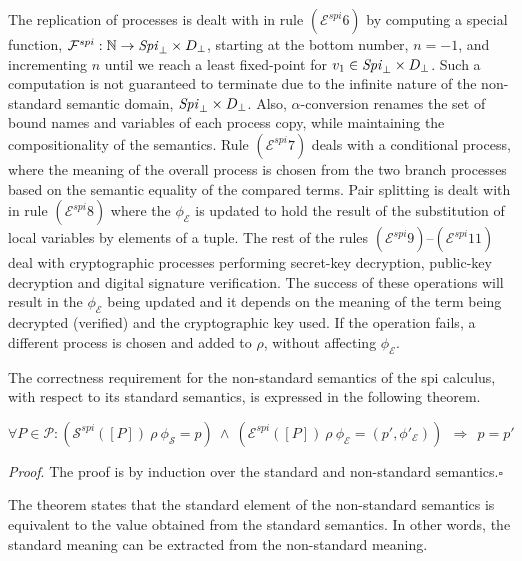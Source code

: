 \documentclass[10pt,a4paper,final,oneside,fleqn]{book}
\begin{document}
The replication of processes is dealt with in rule $(\mathcal{E}^{spi}6)$ by computing a special function, $\mathcal{F}^{spi}:\mathbb{N}\to\mbox{{\itshape Spi\/}}_\bot\times D_\bot$, starting at the bottom number, $n=-1$, and incrementing $n$ until we reach a least fixed-point for $v_1\in\mbox{{\itshape Spi\/}}_\bot\times D_\bot$.  Such a computation is not guaranteed to terminate due to the infinite nature of the non-standard semantic domain, $\mbox{{\itshape Spi\/}}_\bot\times D_\bot$. Also, $\alpha$-conversion renames the set of bound names and variables of each process copy, while maintaining the compositionality of the semantics. Rule $(\mathcal{E}^{spi}7)$ deals with a conditional process, where the meaning of the overall process is chosen from the two branch processes based on the semantic equality of the compared terms.  Pair splitting is dealt with in rule $(\mathcal{E}^{spi}8)$ where the $\phi_\mathcal{E}$ is updated to hold the result of the substitution of local variables by elements of a tuple. The rest of the rules $(\mathcal{E}^{spi}9)$--$(\mathcal{E}^{spi}11)$ deal with cryptographic processes performing secret-key decryption, public-key decryption and digital signature verification.  The success of these operations will result in the $\phi_\mathcal{E}$ being updated and it depends on the meaning of the term being decrypted (verified) and the cryptographic key used.  If the operation fails, a different process is chosen and added to $\rho$, without affecting $\phi_\mathcal{E}$.

The correctness requirement for the non-standard semantics of the spi calculus, with respect to its standard semantics, is expressed in the following theorem.
\begin{theor}\label{correctspi}
$ $\\
$\forall P\in\mathcal{P}:(\mathcal{S}^{spi}(\![P]\!)~\rho~\phi_\mathcal{S}=p)~\wedge~(\mathcal{E}^{spi}(\![P]\!)~\rho~\phi_\mathcal{E}=(p',\phi'_\mathcal{E}))~~\Rightarrow~~p=p'$
\end{theor}
{\itshape Proof\/}. The proof is by induction over the standard and non-standard semantics.\hfill$\square$

The theorem states that the standard element of the non-standard semantics is equivalent to the value obtained from the standard semantics.  In other words, the standard meaning can be extracted from the non-standard meaning.
\end{document}
